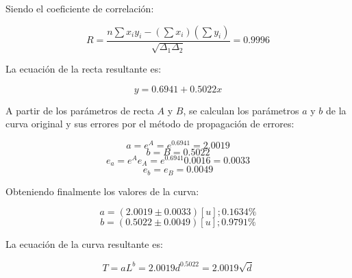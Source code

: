 \documentclass[letter,11pt]{article}
\begin{document}
Siendo el coeficiente de correlación:

\begin{equation*}
    R = \frac{n \sum x_i y_i - (\sum x_i)(\sum y_i)}{\sqrt{\Delta_1 \Delta_2}} = 0.9996
\end{equation*}

La ecuación de la recta resultante es:

\begin{equation*}
    y = 0.6941 + 0.5022 x
\end{equation*}

A partir de los parámetros de recta $A$ y $B$, se calculan los parámetros $a$ y
$b$ de la curva original y sus errores por el método de propagación de errores:

\begin{equation*}
    a = e^{A} = e^{0.6941} = 2.0019
\end{equation*}
\begin{equation*}
    b = B = 0.5022
\end{equation*}
\begin{equation*}
    e_a = e^A e_A = e^{0.6941} 0.0016 = 0.0033
\end{equation*}
\begin{equation*}
    e_b = e_B = 0.0049
\end{equation*}

Obteniendo finalmente los valores de la curva:

\begin{equation*}
    a = (2.0019 \pm 0.0033) [u]; 0.1634 \%
\end{equation*}
\begin{equation*}
    b = (0.5022 \pm 0.0049) [u]; 0.9791 \%
\end{equation*}

La ecuación de la curva resultante es:

\begin{equation*}
    T = a L^b = 2.0019 d^{0.5022} = 2.0019 \sqrt{d}
\end{equation*}
\end{document}
